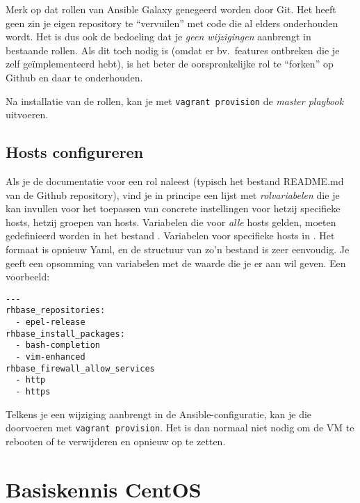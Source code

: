 Merk op dat rollen van Ansible Galaxy genegeerd worden door Git. Het heeft geen zin je eigen repository te ``vervuilen'' met code die al elders onderhouden wordt. Het is dus ook de bedoeling dat je \emph{geen wijzigingen} aanbrengt in bestaande rollen. Als dit toch nodig is (omdat er bv.\ features ontbreken die je zelf geïmplementeerd hebt), is het beter de oorspronkelijke rol te ``forken'' op Github en daar te onderhouden.

Na installatie van de rollen, kan je met \texttt{vagrant\ provision} de \emph{master playbook} uitvoeren.

\subsection{Hosts configureren}%
\label{sub:hosts-configureren}

Als je de documentatie voor een rol naleest (typisch het bestand README.md van de Github repository), vind je in principe een lijst met \emph{rolvariabelen} die je kan invullen voor het toepassen van concrete instellingen voor hetzij specifieke hosts, hetzij groepen van hosts. Variabelen die voor \emph{alle} hosts gelden, moeten gedefinieerd worden in het bestand . Variabelen voor specifieke hosts in . Het formaat is opnieuw Yaml, en de structuur van zo'n bestand is zeer eenvoudig. Je geeft een opsomming van variabelen met de waarde die je er aan wil geven. Een voorbeeld:

\begin{verbatim}
---
rhbase_repositories:
  - epel-release
rhbase_install_packages:
  - bash-completion
  - vim-enhanced
rhbase_firewall_allow_services
  - http
  - https
\end{verbatim}

Telkens je een wijziging aanbrengt in de Ansible-configuratie, kan je die doorvoeren met \texttt{vagrant\ provision}. Het is dan normaal niet nodig om de VM te rebooten of te verwijderen en opnieuw op te zetten.

\section{Basiskennis CentOS}%
\label{sec:basiskennis_centos}

